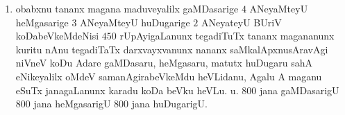 \begin{enumerate}[\rm(1)]
\item obabxnu tananx magana maduveyalilx gaMDasarige $4$ ANeyaMteyU heMgasarige $3$ ANeyaMteyU huDugarige $2$ ANeyateyU BUriV koDabeVkeMdeNisi $450$ rUpAyigaLanunx tegadiTuTx tananx magananunx kuritu nAnu tegadiTaTx darxvayxvanunx nananx saMkalApxnusAravAgi niVneV koDu Adare gaMDasaru, heMgasaru, matutx huDugaru sahA eNikeyalilx oMdeV samanAgirabeVkeMdu heVLidanu, Agalu A maganu eSuTx janagaLanunx karadu koDa beVku heVLu. 
\hfill u. $800$ jana gaMDasarigU $800$ jana heMgasarigU $800$ jana huDugarigU. 
\end{enumerate}


